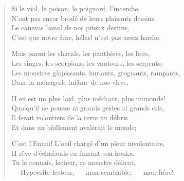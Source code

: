 \documentclass[12pt]{article}
\begin{document}
\begin{singlespacing}
\begin{verse}
Si le viol, le poison, le poignard, l'incendie,\\
N'ont pas encor brod\'e de leurs plaisants dessins\\
Le canevas banal de nos piteux destins,\\
C'est que notre \^ame, h\'elas! n'est pas assez hardie.
\vspace{\baselineskip}

Mais parmi les chacals, les panth\`eres, les lices,\\
Les singes, les scorpions, les vautours, les serpents,\\
Les monstres glapissants, hurlants, grognants, rampants,\\
Dans la m\'enagerie inf\^ame de nos vices,
\vspace{\baselineskip}

II en est un plus laid, plus m\'echant, plus immonde!\\
Quoiqu'il ne pousse ni grands gestes ni grands cris,\\
Il ferait volontiers de la terre un d\'ebris\\
Et dans un b\^aillement avalerait le monde;
\vspace{\baselineskip}

C'est l'Ennui! L'oeil charg\'e d'un pleur involontaire,\\
II r\^eve d'\'echafauds en fumant son houka.\\
Tu le connais, lecteur, ce monstre d\'elicat,\\
--- Hypocrite lecteur, --- mon semblable, --- mon fr\`ere!
\end{verse}
\end{singlespacing}
\end{document}
